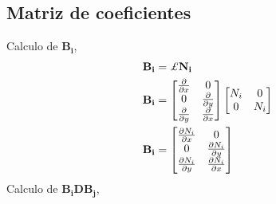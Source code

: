 \subsection{Matriz de coeficientes}
%
Calculo de $\mathbf{B_i}$,
%
\begin{equation}
\begin{split}
&\mathbf{B_i} = \pounds  \mathbf{N_i}	\\
&\mathbf{B_i} = \begin{bmatrix}
	\mdp{}{x} & 0 \\ 
	0         & \mdp{}{y} \\
	\mdp{}{y} & \mdp{}{x}       
\end{bmatrix}
\begin{bmatrix}
	N_i & 0\\ 
	0   & N_i
\end{bmatrix}\\
&\mathbf{B_i} = \begin{bmatrix}
	\mdp{N_i}{x} & 0 \\ 
	0         & \mdp{N_i}{y} \\
	\mdp{N_i}{y} & \mdp{N_i}{x}       
\end{bmatrix}
\end{split}
\end{equation}
%
Calculo de $\mathbf{B_i} \mathbf{D} \mathbf{B_j}$,
%
